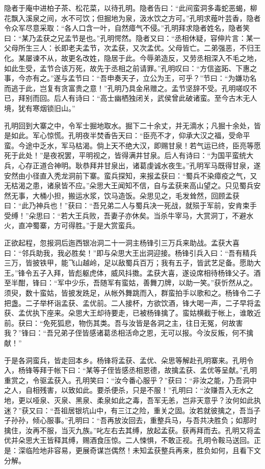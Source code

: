 隐者于庵中进柏子茶、松花菜，以待孔明。隐者告曰：“此间蛮洞多毒蛇恶蝎，柳花飘入溪泉之间，水不可饮；但掘地为泉，汲水饮之方可。”孔明求薤叶芸香，隐者令众军尽意采取：“各人口含一叶，自然瘴气不侵。”孔明拜求隐者姓名，隐者笑曰：“某乃孟获之兄孟节是也。”孔明愕然。隐者又曰：“丞相休疑，容伸片言：某一父母所生三人：长即老夫孟节，次孟获，又次孟优。父母皆亡。二弟强恶，不归王化。某屡谏不从，故更名改姓，隐居于此。今辱弟造反，又劳丞相深入不毛之地，如此生受，孟节合该万死，故先于丞相之前请罪。”孔明叹曰：“方信盗跖、下惠之事，今亦有之。”遂与孟节曰：“吾申奏天子，立公为王，可乎？”节曰：“为嫌功名而逃于此，岂复有贪富贵之意！”孔明乃具金帛赠之。孟节坚辞不受。孔明嗟叹不已，拜别而回。后人有诗曰：“高士幽栖独闭关，武侯曾此破诸蛮。至今古木无人境，犹有寒烟锁旧山。”

孔明回到大寨之中，令军士掘地取水。掘下二十余丈，并无滴水；凡掘十余处，皆是如此。军心惊慌。孔明夜半焚香告天曰：“臣亮不才，仰承大汉之福，受命平蛮。今途中乏水，军马枯渴。倘上天不绝大汉，即赐甘泉！若气运已终，臣亮等愿死于此处！”是夜祝罢，平明视之，皆得满井甘泉。后人有诗曰：“为国平蛮统大兵，心存正道合神明。耿恭拜井甘泉出，诸葛虔诚水夜生。”孔明军马既得甘泉，遂安然由小径直入秃龙洞前下寨。蛮兵探知，来报孟获曰：“蜀兵不染瘴疫之气，又无枯渴之患，诸泉皆不应。”朵思大王闻知不信，自与孟获来高山望之。只见蜀兵安然无事，大桶小担，搬运水浆，饮马造饭。朵思见之，毛发耸然，回顾孟获曰：“此乃神兵也！”获曰：“吾兄弟二人与蜀兵决一死战，就殒于军前，安肯束手受缚！”朵思曰：“若大王兵败，吾妻子亦休矣。当杀牛宰马，大赏洞丁，不避水火，直冲蜀寨，方可得胜。”于是大赏蛮兵。

正欲起程，忽报洞后迤西银冶洞二十一洞主杨锋引三万兵来助战。孟获大喜曰：“邻兵助我，我必胜矣！”即与朵思大王出洞迎接。杨锋引兵入曰：“吾有精兵三万，皆披铁甲，能飞山越岭，足以敌蜀兵百万；我有五子，皆武艺足备。愿助大王。”锋令五子入拜，皆彪躯虎体，威风抖擞。孟获大喜，遂设席相待杨锋父子。酒至半酣，锋曰：“军中少乐，吾随军有蛮姑，善舞刀牌，以助一笑。”获忻然从之。须臾，数十蛮姑，皆披发跣足，从帐外舞跳而入，群蛮拍手以歌和之。杨锋令二子把盏。二子举杯诣孟获、孟优前。二人接杯，方欲饮酒，锋大喝一声，二子早将孟获、孟优执下座来。朵思大王却待要走，已被杨锋擒了。蛮姑横截于帐上，谁敢近前。获曰：“免死狐悲，物伤其类。吾与汝皆是各洞之主，往日无冤，何故害我？”锋曰：“吾兄弟子侄皆感诸葛丞相活命之恩，无可以报。今汝反叛，何不擒献！”

于是各洞蛮兵，皆走回本乡。杨锋将孟获、孟优、朵思等解赴孔明寨来。孔明令入，杨锋等拜于帐下曰：“某等子侄皆感丞相恩德，故擒孟获、孟优等呈献。”孔明重赏之，令驱孟获入。孔明笑曰：“汝今番心服乎？”获曰：“非汝之能，乃吾洞中之人，自相残害，以致如此。要杀便杀，只是不服！”孔明曰：“汝赚吾入无水之地，更以哑泉、灭泉、黑泉、柔泉如此之毒，吾军无恙，岂非天意乎？汝何如此执迷？”获又曰：“吾祖居银坑山中，有三江之险，重关之固。汝若就彼擒之，吾当子子孙孙，倾心服事。”孔明曰：“吾再放汝回去，重整兵马，与吾共决胜负；如那时擒住，汝再不服，当灭九族。”叱左右去其缚，放起孟获。获再拜而去。孔明又将孟优并朵思大王皆释其缚，赐酒食压惊。二人悚惧，不敢正视。孔明令鞍马送回。正是：深临险地非容易，更展奇谋岂偶然！未知孟获整兵再来，胜负如何，且看下文分解。